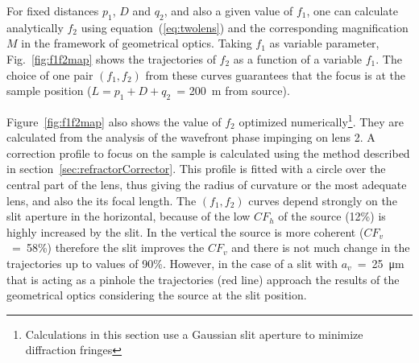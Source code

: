 \documentclass{iucr}              %
\begin{document}
For fixed distances $p_1$, $D$ and $q_2$, and also a given value of $f_1$, one can calculate analytically $f_2$ using  equation~(\ref{eq:twolens}) and the corresponding magnification $M$ in the framework of geometrical optics. Taking $f_1$ as variable parameter,  
Fig.~\ref{fig:f1f2map} shows the trajectories of $f_2$ as a function of a variable $f_1$. 
The choice of one pair $(f_1,f_2)$ from these curves guarantees that the focus is at the sample position ($L=p_1+D+q_2$~= \SI{200}{\meter} from source).

Figure~\ref{fig:f1f2map} also shows the value of $f_2$ optimized numerically\footnote{Calculations in this section use a Gaussian slit aperture to minimize diffraction fringes}. They are calculated from the analysis of the wavefront phase impinging on lens 2. A correction profile to focus on the sample is calculated using the method described in section~\ref{sec:refractorCorrector}. This profile is fitted with a circle over the central part of the lens, thus giving the radius of curvature or the most adequate lens, and also the its focal length. 
The $(f_1,f_2)$ curves depend strongly on the slit aperture in the horizontal, because of the low $CF_h$ of the source (12\%) is highly increased by the slit. In the vertical the source is more coherent ($CF_v$~=~58\%) therefore the slit improves the $CF_v$  and there is not much change in the trajectories up to values of 90\%. However, in the case of a slit with $a_v$~=~\SI{25}{\micro\meter} that is acting as a pinhole the trajectories (red line) approach the results of the geometrical optics considering the source at the slit position.
\end{document}
